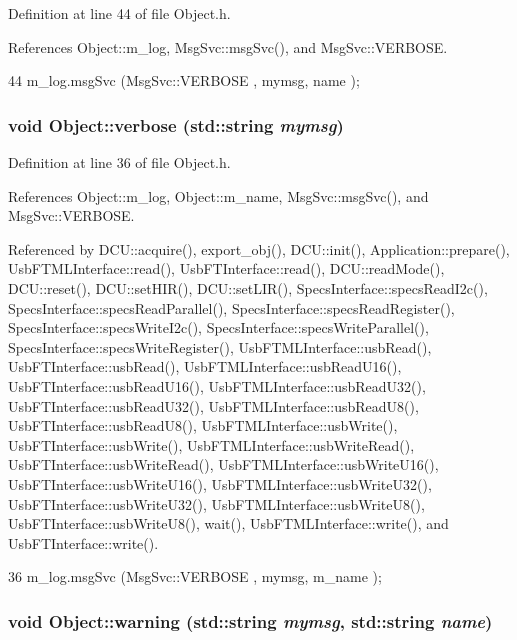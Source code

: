 Definition at line 44 of file Object.h.

References Object::m\_\-log, MsgSvc::msgSvc(), and MsgSvc::VERBOSE.


\begin{DoxyCode}
44 { m_log.msgSvc (MsgSvc::VERBOSE , mymsg, name ); }
\end{DoxyCode}
\hypertarget{classObject_a83d2db2df682907ea1115ad721c1c4a1}{
\subsubsection[{verbose}]{\setlength{\rightskip}{0pt plus 5cm}void Object::verbose (std::string {\em mymsg})}}
\label{classObject_a83d2db2df682907ea1115ad721c1c4a1}


Definition at line 36 of file Object.h.

References Object::m\_\-log, Object::m\_\-name, MsgSvc::msgSvc(), and MsgSvc::VERBOSE.

Referenced by DCU::acquire(), export\_\-obj(), DCU::init(), Application::prepare(), UsbFTMLInterface::read(), UsbFTInterface::read(), DCU::readMode(), DCU::reset(), DCU::setHIR(), DCU::setLIR(), SpecsInterface::specsReadI2c(), SpecsInterface::specsReadParallel(), SpecsInterface::specsReadRegister(), SpecsInterface::specsWriteI2c(), SpecsInterface::specsWriteParallel(), SpecsInterface::specsWriteRegister(), UsbFTMLInterface::usbRead(), UsbFTInterface::usbRead(), UsbFTMLInterface::usbReadU16(), UsbFTInterface::usbReadU16(), UsbFTMLInterface::usbReadU32(), UsbFTInterface::usbReadU32(), UsbFTMLInterface::usbReadU8(), UsbFTInterface::usbReadU8(), UsbFTMLInterface::usbWrite(), UsbFTInterface::usbWrite(), UsbFTMLInterface::usbWriteRead(), UsbFTInterface::usbWriteRead(), UsbFTMLInterface::usbWriteU16(), UsbFTInterface::usbWriteU16(), UsbFTMLInterface::usbWriteU32(), UsbFTInterface::usbWriteU32(), UsbFTMLInterface::usbWriteU8(), UsbFTInterface::usbWriteU8(), wait(), UsbFTMLInterface::write(), and UsbFTInterface::write().


\begin{DoxyCode}
36 { m_log.msgSvc (MsgSvc::VERBOSE , mymsg, m_name ); }
\end{DoxyCode}
\hypertarget{classObject_a11f101db4dd73d9391b0231818881d86}{
\subsubsection[{warning}]{\setlength{\rightskip}{0pt plus 5cm}void Object::warning (std::string {\em mymsg}, \/  std::string {\em name})}}
\label{classObject_a11f101db4dd73d9391b0231818881d86}


